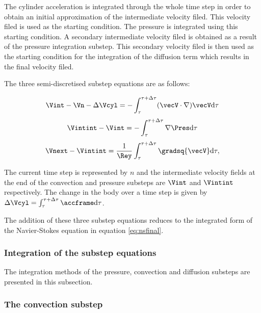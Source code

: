  The cylinder acceleration is integrated through the whole time step in order to obtain an initial approximation of the intermediate velocity filed. This velocity filed is used as the starting condition. The pressure is integrated using this starting condition.  A secondary intermediate velocity filed is obtained as a result of the pressure integration substep. This secondary velocity filed is then used as the starting condition for the integration of the diffusion term which results in the final velocity filed. 
 
 The three semi-discretised substep equations are as follows:
 
\begin{equation} \centering
\label{eq:substep1}
\Vint - \Vn - \Delta\Vcyl = -\int_{\tau}^{\tau+\Delta\tau}(\vecV\cdot\nabla)\vecV \mathrm{d}\tau
\end{equation}
\begin{equation} \centering
\label{eq:substep2}
\Vintint - \Vint = -\int_{\tau}^{\tau+\Delta\tau}\nabla\Pres \mathrm{d}\tau
\end{equation}
\begin{equation} \centering
\label{eq:substep3}
\Vnext-\Vintint = \frac{1}{\Rey}\int_{\tau}^{\tau+\Delta\tau}\gradsq{\vecV} \mathrm{d}\tau,
\end{equation} 
 
The current time step is represented by $n$ and the intermediate velocity fields at the end of the convection and pressure substeps are $\Vint$ and $\Vintint$ respectively. The change in the body over a time step is given by $\Delta\Vcyl =
\int_{\tau}^{\tau+\Delta\tau}\accframe \mathrm{d}\tau$. 

The addition of these three substep equations reduces to the integrated form of the Navier-Stokes equation in equation \ref{eq:nsfinal}. 

\subsubsection{Integration of the substep equations}
\label{subsec:sol}
 
 The integration methods of the pressure, convection and diffusion substeps are presented in this subsection. 
 
 \subsubsection{The convection substep}
 \label{subsub:convec}
 
